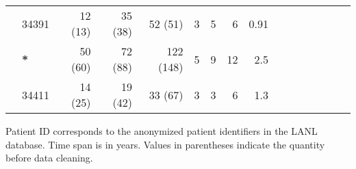 \documentclass[12pt]{article}
\newcommand{\badpat}{\gdef\currentrowstyle{\bfseries}\bfseries\ignorespaces }
\begin{document}
\begin{sidewaystable}
{\begin{center}
\begin{tabular}{ll*{14}{r}}
\cite{Novitsky09}%
& 34391 & 12 (13) & 35 (38) & 52 (51) & 3 & 5 & 6 & 0.91 \\
& \badpat 34399* & 50 (60) & 72 (88) & 122 (148) & 5 & 9 & 12 & 2.5 \\
& 34411 & 14 (25) & 19 (42) & 33 (67) & 3 & 3 & 6 & 1.3 \\
\hline
\end{tabular}
\end{center}
}
	Patient ID corresponds to the anonymized patient identifiers in the LANL database.
	Time span is in years.
	Values in parentheses indicate the quantity before data cleaning.
\end{sidewaystable}

\pagebreak{}
\end{document}
